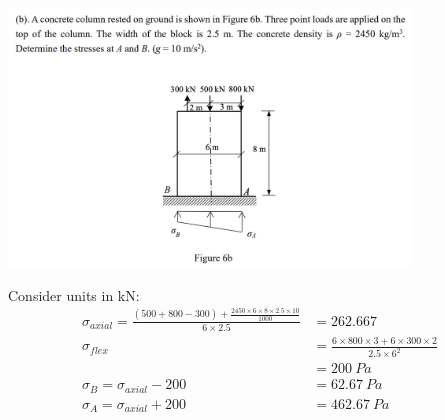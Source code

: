 \documentclass{article}
\begin{document}
\begin{center}
    \includegraphics[width=0.8\textwidth]{img/2-2.jpg}
\end{center}
Consider units in kN:
\begin{align*}
    \sigma_{axial} = \frac{(500 + 800 - 300)+\frac{2450\times6\times8\times2.5\times10}{1000}}{6\times2.5} & = 262.667                                                  \\
    \sigma_{flex}                                                                                          & =\frac{6\times800\times3+6\times300\times2}{2.5\times 6^2} \\
                                                                                                           & = 200\ Pa                                                  \\
    \sigma_B = \sigma_{axial} - 200                                                                        & = 62.67\ Pa                                                \\
    \sigma_A = \sigma_{axial} + 200                                                                        & = 462.67\ Pa                                               \\
\end{align*}
\end{document}
